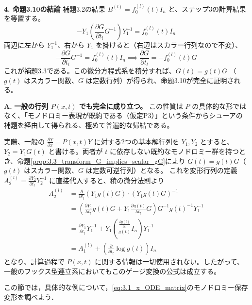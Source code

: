 \begin{Q}
\textbf{4. 命題3.10の結論}
補題3.2の結果 $B^{(l)} = f_0^{(l)}(t)I_n$ と、ステップ3の計算結果を等置する。
\[
  - Y_1 \left( \frac{\partial G}{\partial t_l} G^{-1} \right) Y_1^{-1} = f_0^{(l)}(t)I_n
\]
両辺に左から $Y_1^{-1}$、右から $Y_1$ を掛けると（右辺はスカラー行列なので不変）、
\[
  - \frac{\partial G}{\partial t_l} G^{-1} = f_0^{(l)}(t)I_n \implies \frac{\partial G}{\partial t_l} = -f_0^{(l)}(t)G
\]
これが補題3.3である。この微分方程式系を積分すれば、$G(t) = g(t)G$ （$g(t)$ はスカラー関数、$G$ は定数行列）が得られ、命題3.10が完全に証明される。
\end{Q}

\begin{Q}
\textbf{A.} \textbf{一般の行列 $P(x,t)$ でも完全に成り立つ。}
この性質は $P$ の具体的な形ではなく、「モノドロミー表現が既約である（仮定P3）」という条件からシューアの補題を経由して得られる、極めて普遍的な帰結である。

実際、一般の $\frac{\partial Y}{\partial x} = P(x,t) Y$ に対する2つの基本解行列を $Y_1, Y_2$ とすると、$Y_2 = Y_1 G(t)$ と書ける。両者が $t$ に依存しない既約なモノドロミー群を持つとき、命題\ref{prop:3.3_transform_G_implies_scalar_gG}により $G(t) = g(t)G$（$g(t)$ はスカラー関数、$G$ は定数可逆行列）となる。
これを変形行列の定義 $A_2^{(l)} = \frac{\partial Y_2}{\partial t_l}Y_2^{-1}$ に直接代入すると、積の微分法則より
\begin{align*}
  A_2^{(l)} &= \frac{\partial}{\partial t_l}\left(Y_1 g(t)G\right) \cdot \left(Y_1 g(t)G\right)^{-1} \\
  &= \left( \frac{\partial Y_1}{\partial t_l} g(t)G + Y_1 \frac{\partial g(t)}{\partial t_l} G \right) G^{-1} g(t)^{-1} Y_1^{-1} \\
  &= \frac{\partial Y_1}{\partial t_l} Y_1^{-1} + Y_1 \left( \frac{\frac{\partial g(t)}{\partial t_l}}{g(t)} I_n \right) Y_1^{-1} \\
  &= A_1^{(l)} + \left( \frac{\partial}{\partial t_l} \log g(t) \right) I_n
\end{align*}
となり、計算過程で $P(x,t)$ に関する情報は一切使用されない。したがって、一般のフックス型連立系においてもこのゲージ変換の公式は成立する。
\end{Q}

この節では，具体的な例について，\eqref{eq:3.1_x_ODE_matrix}のモノドロミー保存変形を調べよう．

